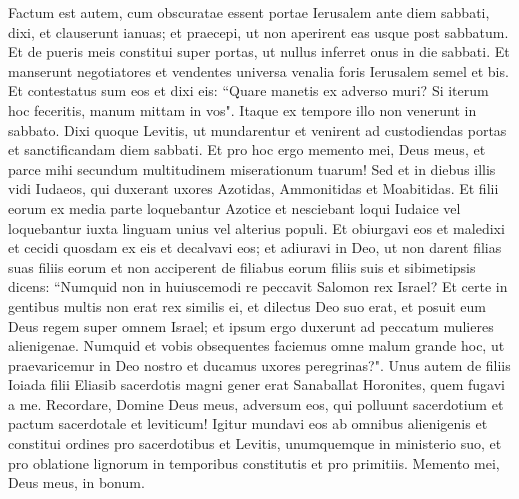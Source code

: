 \begin{biblechapter}
\verse Factum est autem, cum obscuratae essent portae Ierusalem ante diem sabbati, dixi, et clauserunt ianuas; et praecepi, ut non aperirent eas usque post sabbatum. Et de pueris meis constitui super portas, ut nullus inferret onus in die sabbati. 
\verse Et manserunt negotiatores et vendentes universa venalia foris Ierusalem semel et bis. 
\verse Et contestatus sum eos et dixi eis: “Quare manetis ex adverso muri? Si iterum hoc feceritis, manum mittam in vos". Itaque ex tempore illo non venerunt in sabbato. 
\verse Dixi quoque Levitis, ut mundarentur et venirent ad custodiendas portas et sanctificandam diem sabbati. Et pro hoc ergo memento mei, Deus meus, et parce mihi secundum multitudinem miserationum tuarum! 
\verse Sed et in diebus illis vidi Iudaeos, qui duxerant uxores Azotidas, Ammonitidas et Moabitidas. 
\verse Et filii eorum ex media parte loquebantur Azotice et nesciebant loqui Iudaice vel loquebantur iuxta linguam unius vel alterius populi. 
\verse Et obiurgavi eos et maledixi et cecidi quosdam ex eis et decalvavi eos; et adiuravi in Deo, ut non darent filias suas filiis eorum et non acciperent de filiabus eorum filiis suis et sibimetipsis dicens: 
\verse “Numquid non in huiuscemodi re peccavit Salomon rex Israel? Et certe in gentibus multis non erat rex similis ei, et dilectus Deo suo erat, et posuit eum Deus regem super omnem Israel; et ipsum ergo duxerunt ad peccatum mulieres alienigenae. 
\verse Numquid et vobis obsequentes faciemus omne malum grande hoc, ut praevaricemur in Deo nostro et ducamus uxores peregrinas?". 
\verse Unus autem de filiis Ioiada filii Eliasib sacerdotis magni gener erat Sanaballat Horonites, quem fugavi a me. 
\verse Recordare, Domine Deus meus, adversum eos, qui polluunt sacerdotium et pactum sacerdotale et leviticum!  
\verse Igitur mundavi eos ab omnibus alienigenis et constitui ordines pro sacerdotibus et Levitis, unumquemque in ministerio suo, 
\verse et pro oblatione lignorum in temporibus constitutis et pro primitiis. Memento mei, Deus meus, in bonum.
\end{biblechapter}
